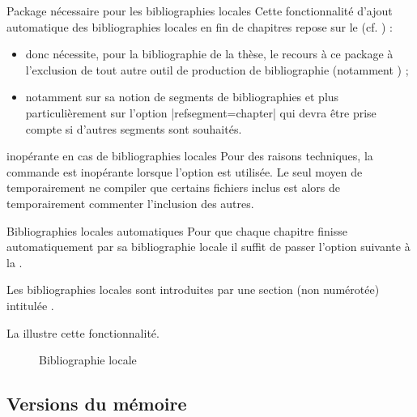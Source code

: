 \begin{dbwarning}{Package  nécessaire pour les bibliographies
    locales}{}
  Cette fonctionnalité d'ajout automatique des bibliographies locales en fin de
  chapitres repose sur le  (cf. ) :
  \begin{itemize}
  \item donc nécessite, pour la bibliographie de la thèse, le recours à ce
    package \alert{à l'exclusion de tout autre outil de production de
      bibliographie} (notamment ) ;
  \item notamment sur sa notion de segments de bibliographies et plus
    particulièrement sur l'option |refsegment=chapter| qui devra être prise
    compte si d'autres segments sont souhaités.
  \end{itemize}
\end{dbwarning}

%
\begin{dbwarning}{ inopérante en cas de
    bibliographies locales}{}
  Pour des raisons techniques, la commande  est
  inopérante lorsque l'option  est utilisée. Le seul moyen de
  temporairement ne compiler que certains fichiers inclus est alors de
  temporairement commenter l'inclusion des autres.
\end{dbwarning}

\begin{dbexample}{Bibliographies locales automatiques}{}
  Pour que chaque chapitre finisse automatiquement par sa bibliographie locale
  il suffit de passer l'option suivante à la \yatCl{}.
\end{dbexample}

Les bibliographies locales sont introduites par une section (non numérotée)
intitulée .

La  illustre cette fonctionnalité.
\begin{figure}[htbp]
  \centering
  \caption{Bibliographie locale}
  \label{fig-localbib}
\end{figure}

\subsection{Versions du mémoire}\label{sec-versions}
%

